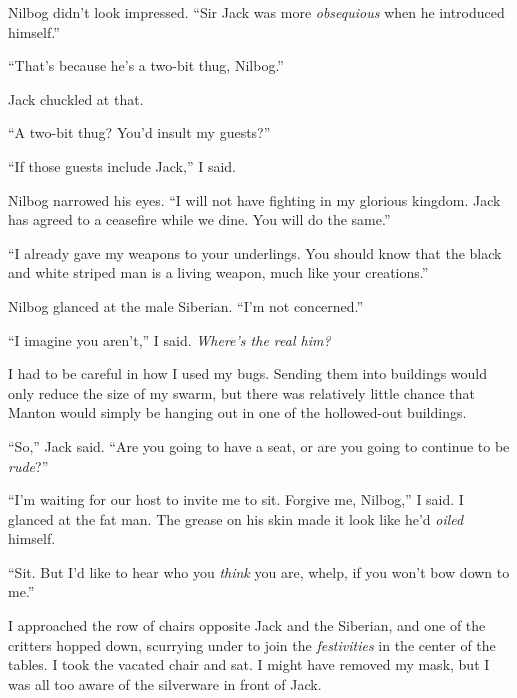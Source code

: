 Nilbog didn't look impressed.  ``Sir Jack was more \emph{obsequious} when he introduced himself.''



``That's because he's a two-bit thug, Nilbog.''



Jack chuckled at that.



``A two-bit thug?  You'd insult my guests?''



``If those guests include Jack,'' I said.



Nilbog narrowed his eyes.  ``I will not have fighting in my glorious kingdom.  Jack has agreed to a ceasefire while we dine.  You will do the same.''



``I already gave my weapons to your underlings.  You should know that the black and white striped man is a living weapon, much like your creations.''



Nilbog glanced at the male Siberian.  ``I'm not concerned.''



``I imagine you aren't,'' I said.  \emph{Where's the real him?}



I had to be careful in how I used my bugs.  Sending them into buildings would only reduce the size of my swarm, but there was relatively little chance that Manton would simply be hanging out in one of the hollowed-out buildings.



``So,'' Jack said.  ``Are you going to have a seat, or are you going to continue to be \emph{rude}?''



``I'm waiting for our host to invite me to sit.  Forgive me, Nilbog,'' I said.  I glanced at the fat man.  The grease on his skin made it look like he'd \emph{oiled} himself.



``Sit.  But I'd like to hear who you \emph{think} you are, whelp, if you won't bow down to me.''



I approached the row of chairs opposite Jack and the Siberian, and one of the critters hopped down, scurrying under to join the \emph{festivities} in the center of the tables.  I took the vacated chair and sat.  I might have removed my mask, but I was all too aware of the silverware in front of Jack.



